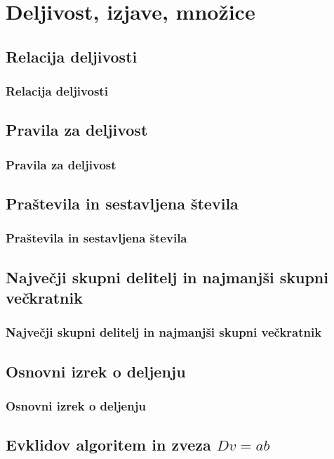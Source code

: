 \section{Deljivost, izjave, množice}

    \subsection{Relacija deljivosti}

        \begin{frame}
            \frametitle{Relacija deljivosti}
        \end{frame}

    \subsection{Pravila za deljivost}

        \begin{frame}
            \frametitle{Pravila za deljivost}
        \end{frame}

    \subsection{Praštevila in sestavljena števila}

        \begin{frame}
            \frametitle{Praštevila in sestavljena števila}
        \end{frame}

    \subsection{Največji skupni delitelj in najmanjši skupni večkratnik}

        \begin{frame}
            \frametitle{Največji skupni delitelj in najmanjši skupni večkratnik}
        \end{frame}

    \subsection{Osnovni izrek o deljenju}

        \begin{frame}
            \frametitle{Osnovni izrek o deljenju}
        \end{frame}

    \subsection{Evklidov algoritem in zveza $Dv=ab$}

